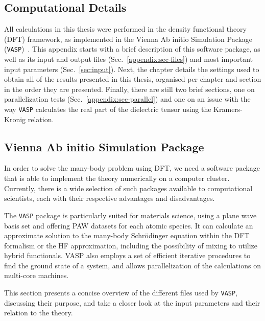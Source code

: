 \begin{refsection} 

\chapter{Computational Details} \label{appendix:sec-computational} 
 
All calculations in this thesis were performed in the density functional 
theory (DFT) framework, as implemented in the Vienna Ab initio Simulation Package 
(\texttt{VASP})~\cite{Kresse1993, Kresse1994, Kresse1996}. This appendix starts with 
a brief description of this software package, as well as its input and 
output files (Sec.~\ref{appendix:sec-files}) and most important input 
parameters (Sec.~\ref{sec:input}). Next, the chapter details the 
settings used to obtain all of the results presented in this thesis, organised 
per chapter and section in the order they are presented. Finally, there are 
still two brief sections, one on parallelization tests 
(Sec.~\ref{appendix:sec-parallel}) and one on an issue with the way 
\texttt{VASP} calculates the real part of the dielectric tensor using 
the Kramers-Kronig relation.

\section{Vienna Ab initio Simulation Package} \label{appendix:sec-VASP} 
 
In order to solve the many-body problem using DFT, we need a software package 
that is able to implement the theory numerically on a computer cluster. 
Currently, there is a wide selection of such packages available to 
computational scientists, each with their respective advantages and 
disadvantages. 
 
The \texttt{VASP} package is particularly suited for materials science, 
using a plane wave basis set and offering PAW datasets for each atomic species. 
It can calculate an approximate solution to the many-body Schr\"odinger equation 
within the DFT formalism or the HF approximation, including the possibility of 
mixing to utilize hybrid functionals. VASP also employs a set of efficient 
iterative procedures to find the ground state of a system, and allows 
parallelization of the calculations on multi-core machines. 
 
This section presents a concise overview of the different files used by 
\texttt{VASP}, discussing their purpose, and take a closer look at the 
input parameters and their relation to the theory. 
 

\end{refsection}
